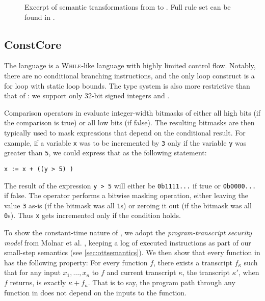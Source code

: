 \begin{figure*}[t]
\begin{druleparx}[Stt]
\end{druleparx}
        \caption{Excerpt of semantic transformations from \constc to \ccore. Full rule set can be found in .}
    \label{fig:transform}
\end{figure*}

\subsection{ConstCore}

The \ccore language is a \textsc{While}-like language \cite{molnar2005} with highly limited
control flow. Notably, there are no conditional branching instructions, and the
only loop construct is a for loop with static loop bounds. The type system
is also more restrictive than that of \constc: we support only 32-bit
signed integers and \bytearrays.

Comparison operators in \ccore evaluate integer-width bitmasks of either all
high bits (if the comparison is true) or all low bits (if false). The resulting
bitmasks are then typically used to mask expressions that depend on the conditional
result. For example, if a variable \texttt{x} was to be incremented by \texttt{3}
only if the variable \texttt{y} was greater than \texttt{5}, we could express that
as the following statement:
\begin{center} \texttt{x := x + ((y > 5) )} \end{center}
The result of the expression \texttt{y > 5} will either be \texttt{0b1111...} if true
or \texttt{0b0000...} if false. The \band operator performs a bitwise masking operation,
either leaving the value \texttt{3} as-is (if the bitmask was all \texttt{1}s) or zeroing
it out (if the bitmask was all \texttt{0}s). Thus \texttt{x} gets incremented only
if the condition holds.

To show the constant-time nature of \ccore, we adopt the
\emph{program-transcript security model} from Molnar et al. \cite{molnar2005},
keeping a log of executed instructions as part of our small-step
semantics (see \autoref{sec:ottsemantics}). We then show that every function in
\ccore has the following property: For every function $f$, there exists a
transcript $f_\kappa$ such that for any input $x_1,\dots,x_n$ to $f$ and
current transcript $\kappa$, the transcript $\kappa'$, when $f$ returns, is
exactly $\kappa + f_\kappa$. That is to say, the program path through any
function in \ccore does not depend on the inputs to the function.

